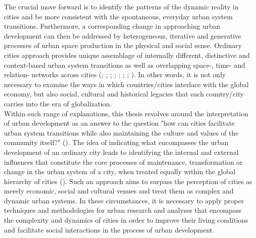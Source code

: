\documentclass[11pt]{report}
\begin{document}
The crucial move forward is to identify the patterns of the dynamic reality in cities and be more consistent with the spontaneous, everyday urban system transitions. Furthermore, a corresponding change in approaching urban development can then be addressed by heterogeneous, iterative and generative processes of urban space production in the physical and social sense.
Ordinary cities approach provides unique assemblage of internally different, distinctive and context-based urban system transitions as well as overlapping space-, time- and relation- networks across cities
(\href{Amin}{\citealt{amin_ordinary_1997}};
\href{Robinson}{\citealt{robinson_global_2002}}; \href{Robinson}{\citealt{robinson_ordinary_2006}}; \href{Roy}{\citealt{roy_urbanisms_2011}}; 
\href{Parnell}{\citealt{parnell_retheorizing_2012}};
\href{Robinson}{\citealt{robinson_urban_2013}}; \href{Robinson}{\citealt{robinson_comparative_2015}}; \href{Robinson}{\citealt{robinson_thinking_2016}}).
In other words, it is not only necessary to examine the ways in which countries/cities interlace with the global economy, but also social, cultural and historical legacies that each country/city carries into the era of globalization.
\\

Within such range of explanations, this thesis revolves around the interpretation of urban development as an answer to the question "how can cities facilitate urban system transitions while also maintaining the culture and values of the community itself?" (\href{ref}{\citealt{kahne_placemaking_2015}}). The idea of indicating what encompasses the urban development of an ordinary city leads to identifying the internal and external influences that constitute the core processes of maintenance, transformation or change in the urban system of a city, when treated equally within the global hierarchy of cities  (\citealt{robinson_global_2002}). 
Such an approach aims to surpass the perception of cities as merely economic, social and cultural venues and treat them as complex and dynamic urban systems. In these circumstances, it is necessary to apply proper techniques and methodologies for urban research and analyses that encompass the complexity and dynamics of cities in order to improve their living conditions and facilitate social interactions in the process of urban development.
\\
\end{document}
